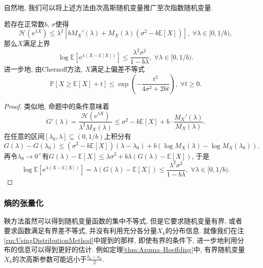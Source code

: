 自然地, 我们可以将上述方法由次高斯随机变量推广至次指数随机变量. 
\begin{proposition}[Bernstein熵的界]\label{thm:BernsteinEntropyBd}
	若存在正常数$b$, $\sigma$使得
	\begin{equation*}
		\mathcal{H}(\mathrm{e}^{\lambda X}) 
		\leq \lambda^2 \left[ b M_X'(\lambda) + M_X(\lambda)(\sigma^2 - b \mathbb{E}[X]) \right],\;
		\forall \lambda \in [0, 1/b), 
	\end{equation*}
	那么$X$满足上界
	\begin{equation*}
		\log \mathbb{E}\left[ \mathrm{e}^{\lambda(X - \mathbb{E}[X])}\right] 
		\leq \frac{\lambda^2 \sigma^2}{1 - b \lambda},\; 
		\forall \lambda \in [0, 1/b). 
	\end{equation*}
	进一步地, 由Chernoff方法, $X$满足上偏差不等式
	\begin{equation*}
		\mathbb{P}[X \geq \mathbb{E}[X] + t] 
		\leq \exp \left(- \frac{t^2}{4 \sigma^2 + 2b t} \right),\;
		\forall t \geq 0. 
	\end{equation*}
\end{proposition}
\begin{proof}
	类似地, 命题中的条件意味着
	\begin{equation*}
		G'(\lambda) 
		= \frac{\mathcal{H}(\mathrm{e}^{\lambda X})}{\lambda^2 M_X(\lambda)}
		\leq \sigma^2 - b \mathbb{E}[X] + b \cdot \frac{M_X'(\lambda)}{M_X(\lambda)}. 
	\end{equation*}
	在任意的区间$[\lambda_0, \lambda] \subseteq (0, 1/b)$上积分有
	\begin{equation*}
		G(\lambda) - G(\lambda_0) 
		\leq (\sigma^2 - b \mathbb{E}[X])(\lambda - \lambda_0) + b(\log M_X(\lambda) - \log M_X(\lambda_0)). 
	\end{equation*}
	再令$\lambda_0 \to 0^+$有$G(\lambda) - \mathbb{E}[X] \leq \lambda \sigma^2 + b \lambda (G(\lambda) - \mathbb{E}[X])$, 于是
	\begin{equation*}
		\log \mathbb{E}\left[\mathrm{e}^{\lambda(X - \mathbb{E}[X])}\right]
		= \lambda(G(\lambda) - \mathbb{E}[X])
		\leq \frac{\lambda^2 \sigma^2}{1 - b \lambda} ,\; 
		\forall \lambda \in [0, 1/b). 
	\end{equation*}
\end{proof}

\subsubsection{熵的张量化}

鞅方法虽然可以得到随机变量函数的集中不等式, 但是它要求随机变量有界, 或者要求函数满足有界差不等式, 并没有利用充分各分量$X_k$的分布信息. 
就像我们在注\ref{rm:UsingDistributionMethod}中提到的那样, 即使有界的条件下, 进一步地利用分布的信息可以得到更好的估计. 
例如定理\ref{thm:Azuma–Hoeffding}中, 有界随机变量$X_k$的次高斯参数可能远小于$\frac{b_k - a_k}{2}$. 

